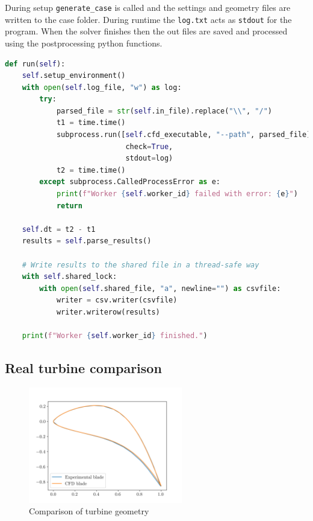 \documentclass{article}
\begin{document}
During setup \texttt{generate\_case} is called and the settings and geometry files are written to the case folder.
During runtime the \texttt{log.txt} acts as \texttt{stdout} for the program.
When the solver finishes then the out files are saved and processed using the postprocessing python functions.

\begin{lstlisting}[language=Python]
def run(self):
    self.setup_environment()
    with open(self.log_file, "w") as log:
        try:
            parsed_file = str(self.in_file).replace("\\", "/")
            t1 = time.time()
            subprocess.run([self.cfd_executable, "--path", parsed_file],
                            check=True,
                            stdout=log)
            t2 = time.time()
        except subprocess.CalledProcessError as e:
            print(f"Worker {self.worker_id} failed with error: {e}")
            return

    self.dt = t2 - t1
    results = self.parse_results()

    # Write results to the shared file in a thread-safe way
    with self.shared_lock:
        with open(self.shared_file, "a", newline="") as csvfile:
            writer = csv.writer(csvfile)
            writer.writerow(results)

    print(f"Worker {self.worker_id} finished.")
\end{lstlisting}

\subsection{Real turbine comparison}

\begin{figure}[H]
    \centering
    \includegraphics[width=0.6\textwidth]{figures/turbine_geometry.png}
    \caption{Comparison of turbine geometry}
    \label{fig:turbine_geometry}
\end{figure}
\end{document}
